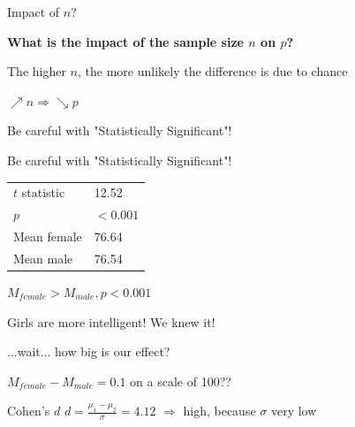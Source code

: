 \documentclass[compress]{beamer}
\begin{document}
\begin{frame}{Impact of $n$?}

    \begin{center}\bf What is the impact of the sample size $n$ on $p$?\end{center}
    \pause

    The higher $n$, the more unlikely the difference is due to chance
    \begin{center}{\Large $\nearrow n \Rightarrow \searrow p$}\end{center}

    \pause
    
\end{frame}

\begin{frame}{Be careful with "Statistically Significant"!}

    \centering

\end{frame}

\begin{frame}{Be careful with "Statistically Significant"!}
    \centering


    \begin{tabular}{@{}ll@{}}
    \toprule
    $t$ statistic & 12.52                 \\
     $p$ & $<0.001$              \\
    Mean female & 76.64                 \\
    Mean male & 76.54                 \\
    \bottomrule
    \end{tabular}


    \vspace{2em}
    \Large $M_{female} > M_{male}, p < 0.001$

    \pause

    Girls are more intelligent! We knew it!

    \pause

    \normalsize
    ...wait... how big is our effect?

    $M_{female} - M_{male} = 0.1$ on a scale of 100??

    \pause

    \begin{alertblock}{Cohen's $d$}
    $d = \frac{\mu_1 - \mu_2}{\sigma} = 4.12$ $\Rightarrow$ high, because
        $\sigma$ very low
    \end{alertblock}

\end{frame}
\end{document}
